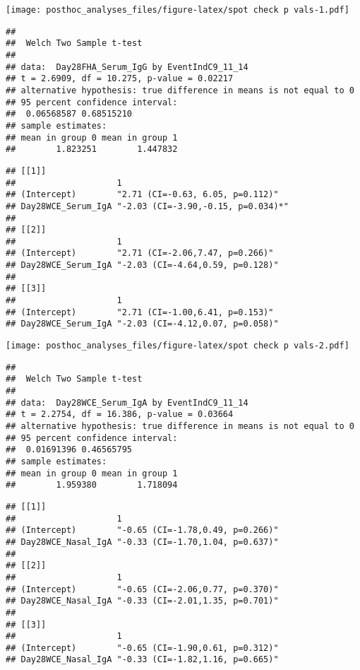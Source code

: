 \documentclass[
]{article}
\begin{document}
\texttt{[image: posthoc\_analyses\_files/figure-latex/spot check p vals-1.pdf]}

\begin{verbatim}
## 
##  Welch Two Sample t-test
## 
## data:  Day28FHA_Serum_IgG by EventIndC9_11_14
## t = 2.6909, df = 10.275, p-value = 0.02217
## alternative hypothesis: true difference in means is not equal to 0
## 95 percent confidence interval:
##  0.06568587 0.68515210
## sample estimates:
## mean in group 0 mean in group 1 
##        1.823251        1.447832
\end{verbatim}

\begin{verbatim}
## [[1]]
##                    1                                 
## (Intercept)        "2.71 (CI=-0.63, 6.05, p=0.112)"  
## Day28WCE_Serum_IgA "-2.03 (CI=-3.90,-0.15, p=0.034)*"
## 
## [[2]]
##                    1                               
## (Intercept)        "2.71 (CI=-2.06,7.47, p=0.266)" 
## Day28WCE_Serum_IgA "-2.03 (CI=-4.64,0.59, p=0.128)"
## 
## [[3]]
##                    1                               
## (Intercept)        "2.71 (CI=-1.00,6.41, p=0.153)" 
## Day28WCE_Serum_IgA "-2.03 (CI=-4.12,0.07, p=0.058)"
\end{verbatim}

\texttt{[image: posthoc\_analyses\_files/figure-latex/spot check p vals-2.pdf]}

\begin{verbatim}
## 
##  Welch Two Sample t-test
## 
## data:  Day28WCE_Serum_IgA by EventIndC9_11_14
## t = 2.2754, df = 16.386, p-value = 0.03664
## alternative hypothesis: true difference in means is not equal to 0
## 95 percent confidence interval:
##  0.01691396 0.46565795
## sample estimates:
## mean in group 0 mean in group 1 
##        1.959380        1.718094
\end{verbatim}

\begin{verbatim}
## [[1]]
##                    1                               
## (Intercept)        "-0.65 (CI=-1.78,0.49, p=0.266)"
## Day28WCE_Nasal_IgA "-0.33 (CI=-1.70,1.04, p=0.637)"
## 
## [[2]]
##                    1                               
## (Intercept)        "-0.65 (CI=-2.06,0.77, p=0.370)"
## Day28WCE_Nasal_IgA "-0.33 (CI=-2.01,1.35, p=0.701)"
## 
## [[3]]
##                    1                               
## (Intercept)        "-0.65 (CI=-1.90,0.61, p=0.312)"
## Day28WCE_Nasal_IgA "-0.33 (CI=-1.82,1.16, p=0.665)"
\end{verbatim}
\end{document}
